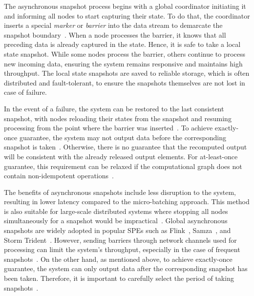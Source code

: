 The asynchronous snapshot process begins with a global coordinator initiating it and informing all nodes to start capturing their state. To do that, the coordinator inserts a special {\em marker} or {\em barrier} into the data stream to demarcate the snapshot boundary~\cite{2015arXiv150608603C, Carbone:2017:SMA:3137765.3137777}. When a node processes the barrier, it knows that all preceding data is already captured in the state. Hence, it is safe to take a local state snapshot. While some nodes process the barrier, others continue to process new incoming data, ensuring the system remains responsive and maintains high throughput. The local state snapshots are saved to reliable storage, which is often distributed and fault-tolerant, to ensure the snapshots themselves are not lost in case of failure. 

In the event of a failure, the system can be restored to the last consistent snapshot, with nodes reloading their states from the snapshot and resuming processing from the point where the barrier was inserted~\cite{2015arXiv150608603C, Carbone:2017:SMA:3137765.3137777}. To achieve exactly-once guarantee, the system may not output data before the corresponding snapshot is taken~\cite{silvestre2021clonos, thepaper}. Otherwise, there is no guarantee that the recomputed output will be consistent with the already released output elements. For at-least-once guarantee, this requirement can be relaxed if the computational graph does not contain non-idempotent operations~\cite{thepaper}.

The benefits of asynchronous snapshots include less disruption to the system, resulting in lower latency compared to the micro-batching approach. This method is also suitable for large-scale distributed systems where stopping all nodes simultaneously for a snapshot would be impractical~\cite{carbone2018scalable}. Global asynchronous snapshots are widely adopted in popular SPEs such as Flink~\cite{carbone2015apache}, Samza~\cite{Noghabi:2017:SSS:3137765.3137770}, and Storm Trident~\cite{apache:storm:trident}. However, sending barriers through network channels used for processing can limit the system's throughput, especially in the case of frequent snapshots~\cite{DBLP:journals/pvldb/BegoliACHKKMS21, trofimov2023bounding}. On the other hand, as mentioned above, to achieve exactly-once guarantee, the system can only output data after the corresponding snapshot has been taken. Therefore, it is important to carefully select the period of taking snapshots~\cite{thepaper}.

